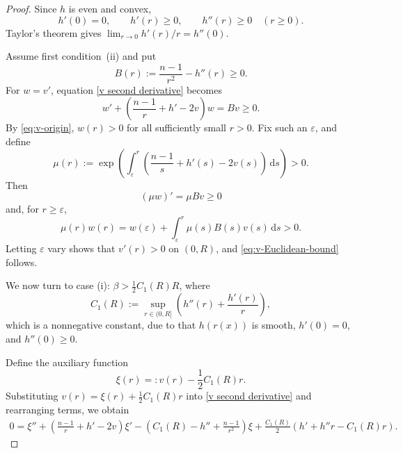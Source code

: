 \documentclass[11pt,leqno]{amsart}
\newcommand{\dd}{\,\mathrm d}
\numberwithin{equation}{section}
\begin{document}
\begin{proof}
Since \(h\) is even and convex,
\[
h'(0)=0,\qquad h'(r)\geq0,\qquad h''(r)\geq0
\quad(r\geq0).
\]
Taylor's theorem gives
\(\displaystyle\lim_{r\to 0}h'(r)/r=h''(0)\).


Assume first condition~\textup{(ii)} and put
\[
B(r):=\frac{n-1}{r^2}-h''(r)\geq0.
\]
For \(w=v'\), equation
\eqref{v second derivative} becomes
\[
w'+\left(\frac{n-1}{r}+h'-2v\right)w=Bv\geq0.
\]
By \eqref{eq:v-origin}, \(w(r)>0\) for all sufficiently small
\(r>0\).  Fix such an \(\varepsilon\), and define
\[
\mu(r):=
\exp\left(
\int_\varepsilon^r
\left(\frac{n-1}{s}+h'(s)-2v(s)\right)\dd s
\right)>0.
\]
Then
\[
(\mu w)'=\mu Bv\geq0
\]
and, for \(r\geq\varepsilon\),
\[
\mu(r)w(r)
=
w(\varepsilon)+\int_\varepsilon^r\mu(s)B(s)v(s)\dd s>0.
\]
Letting \(\varepsilon\) vary shows that \(v'(r)>0\) on \((0,R)\),
and \eqref{eq:v-Euclidean-bound} follows.

We now turn to case (i):
 $\beta >\frac 1 2 C_1(R) R$, where
 $$C_1(R):= \sup_{r\in (0,R]} \left(h''(r) + \frac{h'(r)}{r}\right), $$
 which is a nonnegative constant, due to  that $h(r(x))$ is smooth,  $h'(0)=0$, and $h''(0)\ge 0$.
 
Define the auxiliary function $$\xi(r) = : v(r) - \frac 1 2 C_1(R) r.$$   Substituting   $v(r) = \xi(r) + \frac 1 2 C_1(R) r$ into \eqref{v second derivative} and rearranging terms, we obtain
\begin{align}\label{4.5}   
0 = \xi'' + \left(\frac{n-1}{r}+h'-2v\right)\xi' - \left(C_1(R)-h''+\frac{n-1}{r^{2}}\right)\xi + \frac{C_1(R)}{2}\left(h'+h''r-C_1(R)r\right).
\end{align}


\end{proof}
\end{document}
